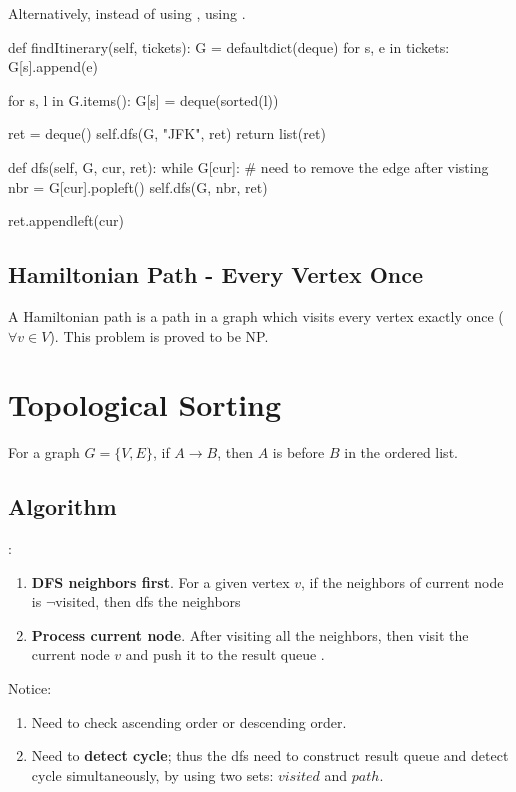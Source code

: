 Alternatively, instead of using , using .
\begin{python}
def findItinerary(self, tickets):
    G = defaultdict(deque)
    for s, e in tickets:
        G[s].append(e)
    
    for s, l in G.items():
        G[s] = deque(sorted(l))
    
    ret = deque()
    self.dfs(G, "JFK", ret)
    return list(ret)

def dfs(self, G, cur, ret):
    while G[cur]:
        # need to remove the edge after visting
        nbr = G[cur].popleft()
        self.dfs(G, nbr, ret)
    
    ret.appendleft(cur)
\end{python}

\subsection{Hamiltonian Path - Every Vertex Once} 

A Hamiltonian path is a path in a graph which visits every vertex exactly once ($\forall v \in V$). This problem is proved to be NP.

\section{Topological Sorting}
For a graph $G=\{V, E\}$, if $A \rightarrow B $, then $A$ is before $B$ in the ordered list.
\subsection{Algorithm}
:
\begin{enumerate}
\item \textbf{DFS neighbors first}. For a given vertex $v$, if the neighbors of current node is  $\neg$visited, then dfs the neighbors
\item \textbf{Process current node}. After visiting all the neighbors, then visit the current node $v$ and push it to the result queue .

\end{enumerate}
Notice:
\begin{enumerate}
\item Need to check ascending order or descending order.
\item Need to \textbf{detect cycle}; thus the dfs need to construct result queue and detect cycle simultaneously, by using two sets: $visited$ and $path$.
\end{enumerate}

